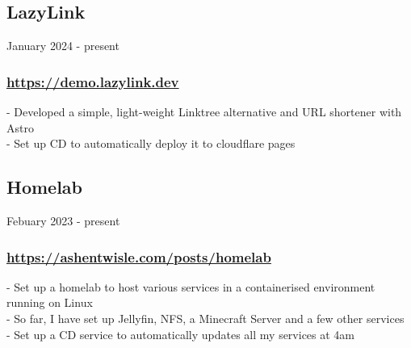 \subsection{LazyLink} January 2024 - present \\
\subsubsection{\href{https://demo.lazylink.dev}{https://demo.lazylink.dev}}
-\: Developed a simple, light-weight Linktree alternative and URL shortener with Astro \\
-\: Set up CD to automatically deploy it to cloudflare pages \\

\subsection{Homelab} Febuary 2023 - present \\
\subsubsection{\href{https://ashentwisle.com/posts/homelab-go-brrr}{https://ashentwisle.com/posts/homelab}}
-\:  Set up a homelab to host various services in a containerised environment running on Linux \\
-\:  So far, I have set up Jellyfin, NFS, a Minecraft Server and a few other services \\
-\:  Set up a CD service to automatically updates all my services at 4am \\



